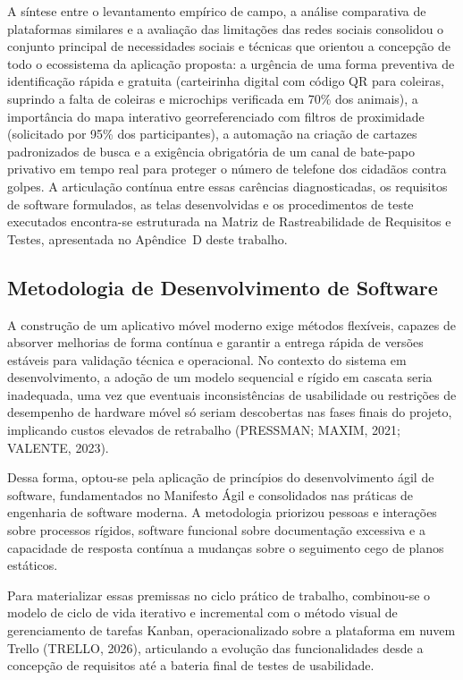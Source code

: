 \clearpage

A síntese entre o levantamento empírico de campo, a análise comparativa de plataformas similares e a avaliação das limitações das redes sociais consolidou o conjunto principal de necessidades sociais e técnicas que orientou a concepção de todo o ecossistema da aplicação proposta: a urgência de uma forma preventiva de identificação rápida e gratuita (carteirinha digital com código QR para coleiras, suprindo a falta de coleiras e microchips verificada em 70\% dos animais), a importância do mapa interativo georreferenciado com filtros de proximidade (solicitado por 95\% dos participantes), a automação na criação de cartazes padronizados de busca e a exigência obrigatória de um canal de bate-papo privativo em tempo real para proteger o número de telefone dos cidadãos contra golpes. A articulação contínua entre essas carências diagnosticadas, os requisitos de software formulados, as telas desenvolvidas e os procedimentos de teste executados encontra-se estruturada na Matriz de Rastreabilidade de Requisitos e Testes, apresentada no Apêndice~D deste trabalho.

\subsection{Metodologia de Desenvolvimento de Software}

A construção de um aplicativo móvel moderno exige métodos flexíveis, capazes de absorver melhorias de forma contínua e garantir a entrega rápida de versões estáveis para validação técnica e operacional. No contexto do sistema em desenvolvimento, a adoção de um modelo sequencial e rígido em cascata seria inadequada, uma vez que eventuais inconsistências de usabilidade ou restrições de desempenho de hardware móvel só seriam descobertas nas fases finais do projeto, implicando custos elevados de retrabalho (PRESSMAN; MAXIM, 2021; VALENTE, 2023).

Dessa forma, optou-se pela aplicação de princípios do desenvolvimento ágil de software, fundamentados no Manifesto Ágil e consolidados nas práticas de engenharia de software moderna. A metodologia priorizou pessoas e interações sobre processos rígidos, software funcional sobre documentação excessiva e a capacidade de resposta contínua a mudanças sobre o seguimento cego de planos estáticos.

Para materializar essas premissas no ciclo prático de trabalho, combinou-se o modelo de ciclo de vida iterativo e incremental com o método visual de gerenciamento de tarefas Kanban, operacionalizado sobre a plataforma em nuvem Trello (TRELLO, 2026), articulando a evolução das funcionalidades desde a concepção de requisitos até a bateria final de testes de usabilidade.

